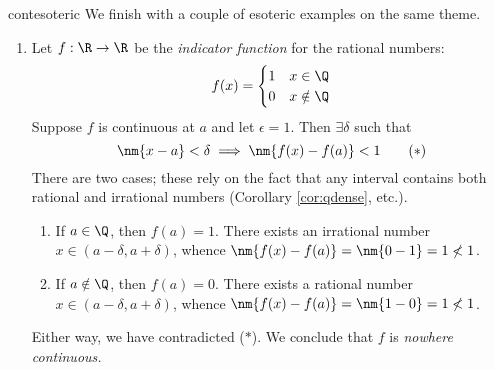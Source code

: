 \begin{examples}{}{contesoteric}
	We finish with a couple of esoteric examples on the same theme.
	\begin{enumerate}

		\item Let $f:\R\to\R$ be the \emph{indicator function} for the rational numbers:
		\[
			f(x)=
			\begin{cases}
				1&x\in\Q\\
				0&x\notin\Q
			\end{cases}
		\]
		Suppose $f$ is continuous at $a$ and let $\epsilon=1$. Then $\exists\delta$ such that 
		\[
			\nm{x-a}<\delta\implies \nm{f(x)-f(a)}<1 \tag{$\ast$}
		\]
		There are two cases; these rely on the fact that any interval contains both rational and irrational numbers (Corollary \ref{cor:qdense}, etc.).
		\begin{enumerate}
			\item If $a\in\Q$, then $f(a)=1$. There exists an irrational number $x\in(a-\delta,a+\delta)$, whence $\nm{f(x)-f(a)}=\nm{0-1}=1\not <1$.
			\item If $a\notin\Q$, then $f(a)=0$. There exists a rational number $x\in(a-\delta,a+\delta)$, whence $\nm{f(x)-f(a)}=\nm{1-0}=1\not <1$.
		\end{enumerate}
		Either way, we have contradicted ($\ast$). We conclude that $f$ is \emph{nowhere continuous.} 
	

\end{enumerate}
\end{examples}
